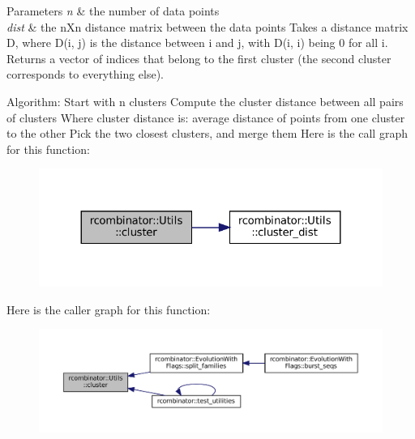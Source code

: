 \begin{DoxyParams}{Parameters}
{\em n} & the number of data points \\
\hline
{\em dist} & the n\+Xn distance matrix between the data points Takes a distance matrix D, where D(i, j) is the distance between i and j, with D(i, i) being 0 for all i. Returns a vector of indices that belong to the first cluster (the second cluster corresponds to everything else).\\
\hline
\end{DoxyParams}
Algorithm\+: Start with n clusters Compute the cluster distance between all pairs of clusters Where cluster distance is\+: average distance of points from one cluster to the other Pick the two closest clusters, and merge them Here is the call graph for this function\+:
\nopagebreak
\begin{figure}[H]
\begin{center}
\leavevmode
\includegraphics[width=324pt]{namespacercombinator_1_1Utils_a7dbf5072b1cc3d4756c46b4acdc59de9_cgraph}
\end{center}
\end{figure}
Here is the caller graph for this function\+:
\nopagebreak
\begin{figure}[H]
\begin{center}
\leavevmode
\includegraphics[width=350pt]{namespacercombinator_1_1Utils_a7dbf5072b1cc3d4756c46b4acdc59de9_icgraph}
\end{center}
\end{figure}
\mbox{\label{namespacercombinator_1_1Utils_a948886c343b7c56fae8e1921dfa5114a}} 

